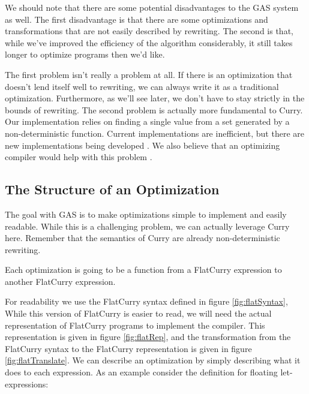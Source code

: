 \documentclass{book}
\theoremstyle{definition}
\newcommand{\Conid}[1]{\mathit{#1}}
\def\resethooks{%
  \global\let\SaveRestoreHook\empty
  \global\let\ColumnHook\empty}
\let\hspre\empty
\let\hspost\empty
\begin{document}
We should note that there are some potential disadvantages to the GAS system as well.
The first disadvantage is that there are some optimizations and transformations
that are not easily described by rewriting.
The second is that, while we've improved the efficiency of the algorithm considerably,
it still takes longer to optimize programs then we'd like.

The first problem isn't really a problem at all.
If there is an optimization that doesn't lend itself well to rewriting,
we can always write it as a traditional optimization.
Furthermore, as we'll see later, we don't have to stay strictly in the bounds of rewriting.
The second problem is actually more fundamental to Curry.
Our implementation relies on finding a single value from a set generated by a non-deterministic function.
Current implementations are inefficient, but there are new implementations being developed
\cite{synthesizedSetFunctions}.
We also believe that an optimizing compiler would help with this problem \cite{this}.

\subsection{The Structure of an Optimization}

The goal with GAS is to make optimizations simple to implement and easily readable.
While this is a challenging problem, we can actually leverage Curry here.
Remember that the semantics of Curry are already non-deterministic rewriting.

Each optimization is going to be a function from a FlatCurry expression to another FlatCurry expression.
\begin{hscode}\SaveRestoreHook
\column{B}{@{}>{\hspre}l<{\hspost}@{}}%
\column{3}{@{}>{\hspre}l<{\hspost}@{}}%
\column{E}{@{}>{\hspre}l<{\hspost}@{}}%
\>[3]{}\;\Conid{Opt}\mathrel{=}\Conid{Expr}\to \Conid{Expr}{}\<[E]%
\ColumnHook
\end{hscode}\resethooks
For readability we use the FlatCurry syntax defined in figure \ref{fig:flatSyntax},
While this version of FlatCurry is easier to read,
we will need the actual representation of FlatCurry programs to implement the compiler.
This representation is given in figure \ref{fig:flatRep}, and the transformation
from the FlatCurry syntax to the FlatCurry representation is given in figure \ref{fig:flatTranslate}.
We can describe an optimization by simply describing what it does to each expression.
As an example consider the definition for floating let-expressions:
\end{document}
